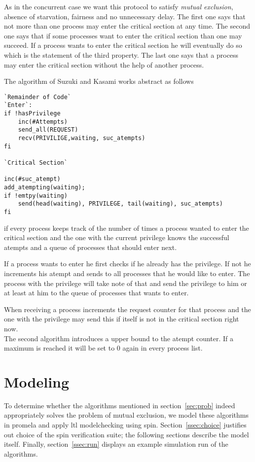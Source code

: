 \documentclass{llncs}
\begin{document}
As in the concurrent case we want this protocol to satisfy \emph{mutual exclusion}, absence of
starvation, fairness and no unnecessary delay. The first one says that not more than one process
may enter the critical section at any time. The second one says that if some processes want to enter
the critical section than one may succeed. If a process wants to enter the critical section he will
eventually do so which is the statement of the third property. The last one says that a process may
enter the critical section without the help of another process.

The algorithm of Suzuki and Kasami works abstract as follows
\begin{lstlisting}
`Remainder of Code`
`Enter`:
if !hasPrivilege
    inc(#Attempts)
    send_all(REQUEST)
    recv(PRIVILIGE,waiting, suc_atempts)
fi

`Critical Section`

inc(#suc_atempt)
add_atempting(waiting);
if !emtpy(waiting)
    send(head(waiting), PRIVILEGE, tail(waiting), suc_atempts)
fi
\end{lstlisting}
if every process keeps track of the number of times a process wanted to enter the critical section
and the one with the current privilege knows the successful atempts and a queue of processes that should
enter next.

If a process wants to enter he first checks if he already has the privilege. If not he increments his atempt and
sends to all processes that he would like to enter. The process with the privilege will take note of that
and send the privilege to him or at least at him to the queue of processes that wants to enter.

When receiving a process increments the request counter for that process and the one with the privilege
may send this if itself is not in the critical section right now.\\

The second algorithm introduces a upper bound to the atempt counter. If a maximum is reached it will be set to
0 again in every process list.


\section{Modeling\label{sec:model}}

To determine whether the algorithms mentioned in section~\ref{sec:prob} indeed appropriately solves
the problem of mutual exclusion, we model these algorithms in promela and apply ltl modelchecking using spin.
Section~\ref{ssec:choice} justifies out choice of the spin verification suite; the following sections
describe the model itself. Finally, section~\ref{ssec:run} displays an example simulation run of the algorithms.
\end{document}
